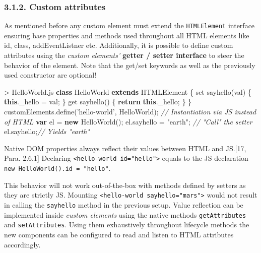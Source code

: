 \documentclass[]{article}
\newenvironment{Shaded}{}{}
\newcommand{\KeywordTok}[1]{\textcolor[rgb]{0.00,0.44,0.13}{\textbf{{#1}}}}
\newcommand{\StringTok}[1]{\textcolor[rgb]{0.25,0.44,0.63}{{#1}}}
\newcommand{\CommentTok}[1]{\textcolor[rgb]{0.38,0.63,0.69}{\textit{{#1}}}}
\newcommand{\VariableTok}[1]{\textcolor[rgb]{0.10,0.09,0.49}{{#1}}}
\newcommand{\ControlFlowTok}[1]{\textcolor[rgb]{0.00,0.44,0.13}{\textbf{{#1}}}}
\newcommand{\OperatorTok}[1]{\textcolor[rgb]{0.40,0.40,0.40}{{#1}}}
\newcommand{\AttributeTok}[1]{\textcolor[rgb]{0.49,0.56,0.16}{{#1}}}
\newcommand{\NormalTok}[1]{{#1}}
\begin{document}
\subsubsection{3.1.2. Custom attributes}\label{custom-attributes}

As mentioned before any custom element must extend the
\texttt{HTMLElement} interface ensuring base properties and methods used
throughout all HTML elements like id, class, addEventListner etc.
Additionally, it is possible to define custom attributes using the
\emph{custom elements'} \textbf{getter / setter interface} to steer the
behavior of the element. Note that the get/set keywords as well as the
previously used constructor are optional!

\begin{Shaded}
\begin{Highlighting}[]
\OperatorTok{>} \VariableTok{HelloWorld}\NormalTok{.}\AttributeTok{js}
\KeywordTok{class} \NormalTok{HelloWorld }\KeywordTok{extends} \NormalTok{HTMLElement }\OperatorTok{\{}
  \NormalTok{set }\AttributeTok{sayhello}\NormalTok{(val) }\OperatorTok{\{}
    \KeywordTok{this}\NormalTok{.}\AttributeTok{_hello} \OperatorTok{=} \NormalTok{val}\OperatorTok{;}
  \OperatorTok{\}}
  \NormalTok{get }\AttributeTok{sayhello}\NormalTok{() }\OperatorTok{\{}
    \ControlFlowTok{return} \KeywordTok{this}\NormalTok{.}\AttributeTok{_hello}\OperatorTok{;}
  \OperatorTok{\}}
\OperatorTok{\}}
\VariableTok{customElements}\NormalTok{.}\AttributeTok{define}\NormalTok{(}\StringTok{'hello-world'}\OperatorTok{,} \NormalTok{HelloWorld)}\OperatorTok{;}
\CommentTok{// Instantiation via JS instead of HTML}
\KeywordTok{var} \NormalTok{el }\OperatorTok{=} \KeywordTok{new} \AttributeTok{HelloWorld}\NormalTok{()}\OperatorTok{;}
\VariableTok{el}\NormalTok{.}\AttributeTok{sayhello} \OperatorTok{=} \StringTok{"earth"}\OperatorTok{;} \CommentTok{// "Call" the setter}
\VariableTok{el}\NormalTok{.}\AttributeTok{sayhello}\OperatorTok{;}\CommentTok{// Yields "earth"}
\end{Highlighting}
\end{Shaded}

Native DOM properties always reflect their values between HTML and
JS.{[}17, Para. 2.6.1{]} Declaring
\texttt{\textless{}hello-world\ id="hello"\textgreater{}} equals to the
JS declaration \texttt{new\ HelloWorld().id\ =\ "hello"}.

This behavior will not work out-of-the-box with methods defined by
setters as they are strictly JS. Mounting
\texttt{\textless{}hello-world\ sayhello="mars"\textgreater{}} would not
result in calling the \texttt{sayhello} method in the previous setup.
Value reflection can be implemented inside \emph{custom elements} using
the native methods \texttt{getAttributes} and \texttt{setAttributes}.
Using them exhaustively throughout lifecycle methods the new components
can be configured to read and listen to HTML attributes accordingly.
\end{document}
